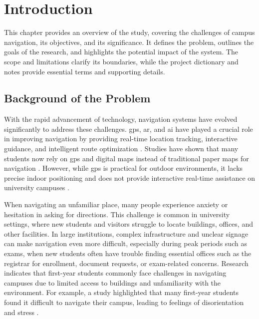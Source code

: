 
\chapter{Introduction}
\begin{refsection}

This chapter provides an overview of the study, covering the challenges of campus navigation, its objectives, and its significance. It defines the problem, outlines the goals of the research, and highlights the potential impact of the system. The scope and limitations clarify its boundaries, while the project dictionary and notes provide essential terms and supporting details.

\section{Background of the Problem}

With the rapid advancement of technology, navigation systems have evolved significantly to address these challenges. \gls{gps}, \gls{ar}, and \gls{ai} have played a crucial role in improving navigation by providing real-time location tracking, interactive guidance, and intelligent route optimization \cite{1}. Studies have shown that many students now rely on \gls{gps} and digital maps instead of traditional paper maps for navigation \cite{2}. However, while \gls{gps} is practical for outdoor environments, it lacks precise indoor positioning and does not provide interactive real-time assistance on university campuses \cite{3}.

When navigating an unfamiliar place, many people experience anxiety or hesitation in asking for directions. This challenge is common in university settings, where new students and visitors struggle to locate buildings, offices, and other facilities. In large institutions, complex infrastructure and unclear signage can make navigation even more difficult, especially during peak periods such as exams, when new students often have trouble finding essential offices such as the registrar for enrollment, document requests, or exam-related concerns. Research indicates that first-year students commonly face challenges in navigating campuses due to limited access to buildings and unfamiliarity with the environment. For example, a study highlighted that many first-year students found it difficult to navigate their campus, leading to feelings of disorientation and stress \cite{4}.


\end{refsection}
